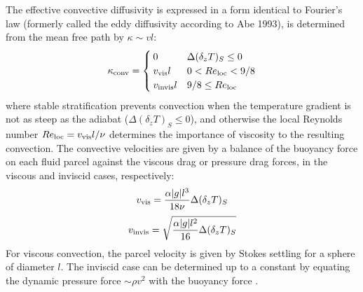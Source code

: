The effective convective diffusivity is expressed in a form identical to Fourier's law (formerly called the eddy diffusivity according to Abe 1993), is determined from the mean free path by $\kappa \sim v l$:
\begin{equation}
  \kappa_{\rm conv} = \begin{cases}
  0 & \Delta(\delta_z T)_S \leq 0 \\
  v_{\rm vis}l & 0 < {Re}_{\rm loc} < 9/8 \\
  v_{\rm invis}l &  9/8 \leq { Re}_{\rm loc}
\end{cases}
\label{eq:convdiff}
\end{equation}
where stable stratification prevents convection when the temperature gradient is not as steep as the adiabat ($\Delta(\delta_z T)_S \leq 0$), and otherwise the local Reynolds number $Re_{\rm loc} = v_{\rm vis} l / \nu$ determines the importance of viscosity to the resulting convection.
The convective velocities are given by a balance of the buoyancy force on each fluid parcel against the viscous drag or pressure drag forces, in the viscous and inviscid cases, respectively:
\begin{equation}
  v_{\rm vis} = \frac{\alpha |g| l^3}{18\nu}  \Delta(\delta_z T)_S \\
\end{equation}
\begin{equation}
  v_{\rm invis} = \sqrt{\frac{\alpha |g| l^2}{16}  \Delta(\delta_z T)_S} \\
\end{equation}
For viscous convection, the parcel velocity is given by Stokes settling for a sphere of diameter $l$. The inviscid case can be determined up to a constant by equating the dynamic pressure force $\sim$$\rho v^2$ with the buoyancy force .



